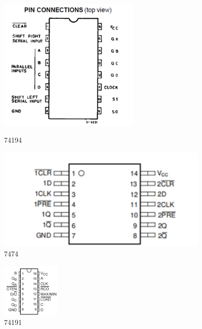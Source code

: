 \documentclass{ctexart}
\begin{document}
\begin{figure}[H]
    \centering
    \begin{minipage}{0.45\textwidth}
    \centering
           \includegraphics[width=0.6\textwidth]{74194.png}
           \caption{74194}
    \label{}
    \end{minipage}
    \hspace{0.05\textwidth}
    \begin{minipage}{0.45\textwidth}
    \centering
           \includegraphics[width=0.9\textwidth]{7474.png}
           \caption{7474}
    \label{7474}
    \end{minipage}
\end{figure}
\begin{figure}[H]
    \centering
    \includegraphics[width=0.25\textwidth]{74191.png}
    \caption{74191}
\end{figure}
\end{document}
